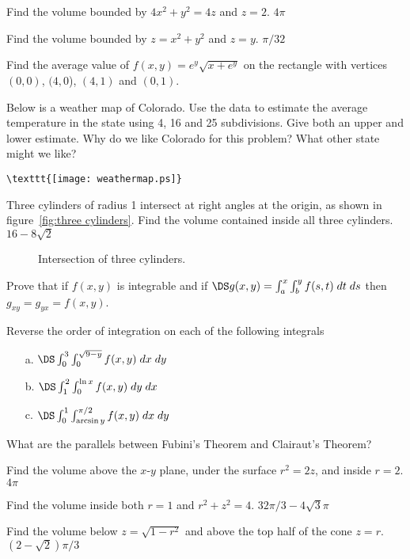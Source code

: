 \begin{multicols}{2}
\problem Find the volume bounded by $4x^2+y^2=4z$ and $z=2$. %
\answer
$4\pi$
\endanswer

\problem Find the volume bounded by $z=x^2+y^2$ and $z=y$. %
\answer
$\pi/32$
\endanswer

\problem Find the average value of $f(x,y)=e^y\sqrt{x+e^y}$ on the %
rectangle with vertices $(0,0)$, $(4,0$), $(4,1)$ and $(0,1)$.

\problem Below is a weather map of Colorado.  Use %
the data to estimate the average temperature in the state using 4,
16 and 25 subdivisions.  Give both an upper and lower estimate.
Why do we like Colorado for this problem?  What
other state might we like?

\verb|\texttt{[image: weathermap.ps]}|

\problem Three cylinders of radius 1 intersect at right angles at the %
origin, as shown in figure~\ref{fig:three cylinders}. Find the
volume contained inside all three cylinders.
\answer
$16-8\sqrt{2}$
\endanswer

\begin{figure}
    \caption{Intersection of three cylinders.}
\end{figure}

\problem Prove that if $f(x,y)$ is integrable and if $\DS g(x,y)=\int_a^x %
\int_b^y f(s,t) \; dt \; ds$ then $g_{xy}=g_{yx}=f(x,y)$.

\problem Reverse the order of integration on each of the following integrals %

\begin{itemize}
\item[a.] $\DS\int_0^3 \int_0^{\sqrt{9-y}} f(x,y)\; dx \; dy$
\item[b.] $\DS\int_1^2 \int_0^{\ln x} f(x,y) \; dy \; dx $
\item[c.] $\DS\int_0^1 \int_{\arcsin y}^{\pi/2} f(x,y) \; dx \; dy$
\end{itemize}

\problem What are the parallels between Fubini's %
Theorem and Clairaut's Theorem?






\problem Find the volume above the $x$-$y$ plane, under the surface %
$r^2=2z$, and inside $r=2$.
\answer
$4\pi$
\endanswer

\problem Find the volume inside both $r=1$ and $r^2+z^2=4$. %
\answer
$32\pi/3-4\sqrt3\pi$
\endanswer

\problem Find the volume below $z=\sqrt{1-r^2}$ and above %
the top half of the cone $z=r$.
\answer
$(2-\sqrt2)\pi/3$
\endanswer


\end{multicols}

